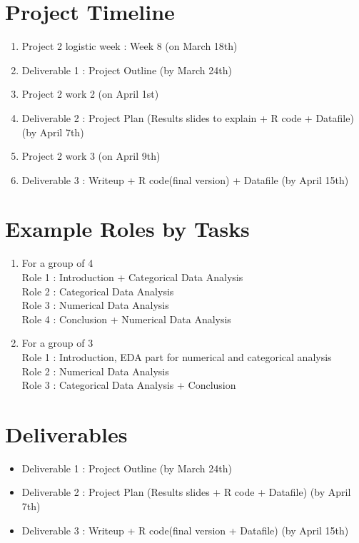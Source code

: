 \documentclass[12pt]{article}
\begin{document}
\section*{Project Timeline}
\begin{enumerate}
    \item Project 2 logistic week : Week 8 (on March 18th)
    \item Deliverable 1 : Project Outline (by March 24th) 
    \item Project 2 work 2 (on April 1st)
    \item Deliverable 2 : Project Plan (Results slides to explain + R code + Datafile) (by April 7th)
    \item Project 2 work 3 (on April 9th)
    \item Deliverable 3 : Writeup + R code(final version) + Datafile (by April 15th)
\end{enumerate}

\section*{Example Roles by Tasks}
\begin{enumerate}
    \item For a group of 4 \\
    Role 1 : Introduction + Categorical Data Analysis   \\
    Role 2 : Categorical Data Analysis \\
    Role 3 : Numerical Data Analysis \\
    Role 4 : Conclusion + Numerical Data Analysis  \\
    \vspace{1em}

    \item For a group of 3 \\
    Role 1 : Introduction, EDA part for numerical and categorical analysis \\
    Role 2 : Numerical Data Analysis \\
    Role 3 : Categorical Data Analysis + Conclusion \\
\end{enumerate}

\section*{Deliverables}
\begin{itemize}
    \item Deliverable 1 : Project Outline (by March 24th) 
    \item Deliverable 2 : Project Plan (Results slides + R code + Datafile) (by April 7th) 
    \item Deliverable 3 : Writeup + R code(final version + Datafile) (by April 15th)
\end{itemize}
\end{document}
